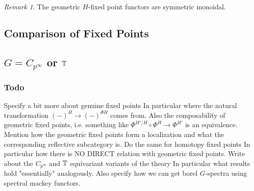 \documentclass[letterpaper]{article}
\theoremstyle{definition}
\theoremstyle{remark}
\newtheorem{remark}{Remark}
\theoremstyle{plain}
\begin{document}
\begin{remark}
		The geometric $H$-fixed point functors are symmetric monoidal.
\end{remark}

\subsection{Comparison of Fixed Points}

\subsection{$G = C_{p^\infty}$ or $\mathbb{T}$}

\subsubsection*{Todo}

\begin{outline}
\1 Specify a bit more about genuine fixed points
	\2 In particular where the natural transformation $(-)^H\rightarrow(-)^{\Phi H}$ comes from.
	\2 Also the composability of geometric fixed points, i.e. something like $\Phi^{H'/H}\circ \Phi^H\rightarrow\Phi^{H'}$ is an equivalence.
	\2 Mention how the geometric fixed points form a localization and what the corresponding reflective subcategory is.
\1 Do the same for homotopy fixed points
	\2 In particular how there is NO DIRECT relation with geometric fixed points.
\1 Write about the $C_{p^\infty}$ and $\mathbb{T}$ equivariant variants of the theory
	\2 In particular what results hold "essentially" analogously.
\1 Also specify how we can get borel $G$-spectra using spectral mackey functors.
\end{outline}
\end{document}

